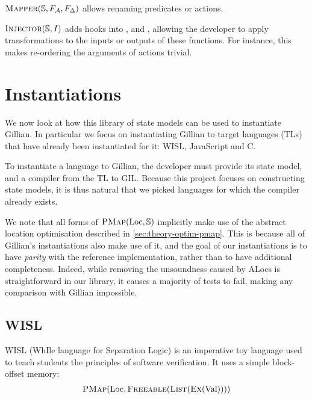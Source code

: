 $\textsc{Mapper}(\mathbb S, F_{\cal{A}}, F_\Delta)$ allows renaming predicates or actions.

$\textsc{Injector}(\mathbb S, I)$ adds hooks into \consume, \produce{} and \execac{}, allowing the developer to apply transformations to the inputs or outputs of these functions. For instance, this makes re-ordering the arguments of actions trivial.

\section{Instantiations} \label{sec:impl-instantiations}

We now look at how this library of state models can be used to instantiate Gillian. In particular we focus on instantiating Gillian to target languages (TLs) that have already been instantiated for it: WISL, JavaScript and C.

To instantiate a language to Gillian, the developer must provide its state model, and a compiler from the TL to GIL. Because this project focuses on constructing state models, it is thus natural that we picked languages for which the compiler already exists.

We note that all forms of $\textsc{PMap}(\text{Loc}, \mathbb S)$ implicitly make use of the abstract location optimisation described in \cref{sec:theory-optim-pmap}. This is because all of Gillian's instantiations also make use of it, and the goal of our instantiations is to have \emph{parity} with the reference implementation, rather than to have additional completeness. Indeed, while removing the unsoundness caused by ALocs is straightforward in our library, it causes a majority of tests to fail, making any comparison with Gillian impossible.

\subsection{WISL}

WISL (WhIle language for Separation Logic) is an imperative toy language used to teach students the principles of software verification. It uses a simple block-offset memory: \begin{align*}
 	\textsc{PMap}(\text{Loc}, \textsc{Freeable}(\textsc{List}(\textsc{Ex}(\text{Val}))))
\end{align*}

